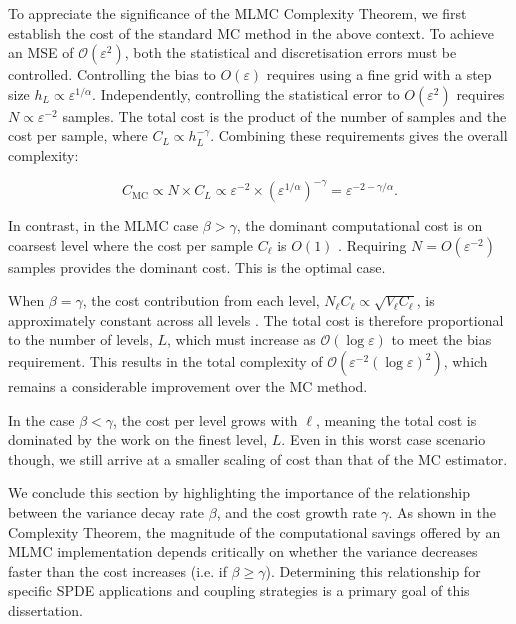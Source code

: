 To appreciate the significance of the MLMC Complexity Theorem, we first establish the cost of the 
standard MC method in the above context. To achieve an MSE of 
$\mathcal{O}(\varepsilon^2)$, both the statistical and discretisation errors must be controlled.
Controlling the bias to $O(\varepsilon)$ requires using a fine grid with a 
step size $h_L \propto \varepsilon^{1/\alpha}$. Independently, controlling the 
statistical error to $O(\varepsilon^2)$ requires 
$N \propto \varepsilon^{-2}$ samples. The total cost is the product of the number of 
samples and the cost per sample, where $C_L \propto h_L^{-\gamma}$. Combining these 
requirements gives the overall complexity:

$$
C_{\mathrm{MC}} \propto N \times C_L \propto \varepsilon^{-2} 
\times (\varepsilon^{1/\alpha})^{-\gamma} = \varepsilon^{-2-\gamma/\alpha}.
$$

In contrast, in the MLMC case $\beta > \gamma$, the dominant computational
cost is on coarsest level where the cost per sample $C_\ell$ is $O(1)$ 
\cite{giles2015multilevel}.
Requiring $N = O(\varepsilon^{-2})$ samples provides the dominant cost. This is the optimal 
case.

When $\beta = \gamma$, the cost contribution from each level, 
$N_\ell C_\ell \propto \sqrt{V_\ell C_\ell}$, is approximately constant across 
all levels \cite{giles2015multilevel}. The total cost is therefore proportional to the 
number of levels, $L$, which must increase as $\mathcal{O}(\log \varepsilon)$ to 
meet the bias requirement. This results in the total complexity of 
$\mathcal{O}(\varepsilon^{-2}(\log \varepsilon)^2)$, which remains a considerable 
improvement over the MC method.

In the case $\beta < \gamma$, the cost per level grows with $\ell$, meaning 
the total cost is dominated by the work on the finest level, $L$. 
Even in this worst case scenario though, we still arrive at a smaller scaling of cost 
than that of the MC estimator. 

We conclude this section by highlighting the importance of the relationship
between the variance decay rate $\beta$, and the cost growth rate $\gamma$. 
As shown in the Complexity Theorem, the magnitude of the computational savings 
offered by an MLMC implementation depends critically on whether the variance 
decreases faster than the cost increases (i.e. if $\beta \ge \gamma$). 
Determining this relationship for specific SPDE applications and coupling 
strategies is a primary goal of this dissertation.

